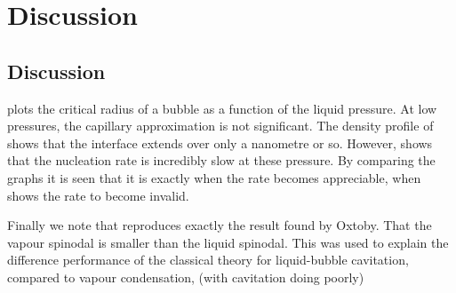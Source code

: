 



\section{Discussion}

\subsection{Discussion}

 plots the critical radius of a bubble as a function of the liquid pressure.
At low pressures, the capillary approximation is not significant.
The density profile of  shows that the interface extends over only a nanometre or so.
However,  shows that the nucleation rate is incredibly slow at these pressure.
By comparing the graphs it is seen that it is exactly when the rate becomes appreciable, 
when  shows the rate to become invalid.

Finally we note that  reproduces exactly the result found by Oxtoby\cite{Oxtoby1988}.
That the vapour spinodal is smaller than the liquid spinodal.
This was used to explain the difference performance of the classical theory for liquid-bubble cavitation, 
compared to vapour condensation, (with cavitation doing poorly)






